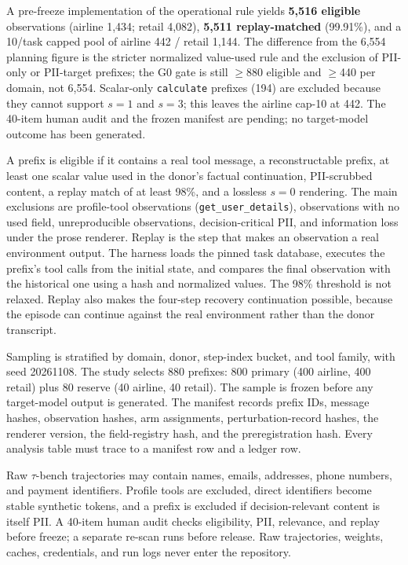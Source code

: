 \documentclass[11pt,a4paper]{article}
\begin{document}
A pre-freeze implementation of the operational rule yields \textbf{5,516 eligible} observations
(airline 1,434; retail 4,082), \textbf{5,511 replay-matched} (99.91\%), and a 10/task capped pool
of airline 442 / retail 1,144. The difference from the 6,554 planning figure is the stricter
normalized value-used rule and the exclusion of PII-only or PII-target prefixes; the G0 gate is
still $\ge$880 eligible and $\ge$440 per domain, not 6,554. Scalar-only \texttt{calculate}
prefixes (194) are excluded because they cannot support $s=1$ and $s=3$; this leaves the airline
cap-10 at 442. The 40-item human audit and the frozen manifest are pending; no target-model
outcome has been generated.

A prefix is eligible if it contains a real tool message, a reconstructable prefix, at least one
scalar value used in the donor's factual continuation, PII-scrubbed content, a replay match of at
least 98\%, and a lossless $s=0$ rendering. The main exclusions are profile-tool observations
(\texttt{get\_user\_details}), observations with no used field, unreproducible observations,
decision-critical PII, and information loss under the prose renderer. Replay is the step that
makes an observation a real environment output. The harness loads the
pinned task database, executes the prefix's tool calls from the initial state, and compares the
final observation with the historical one using a hash and normalized values. The 98\% threshold is
not relaxed. Replay also makes the four-step recovery continuation possible, because the episode
can continue against the real environment rather than the donor transcript.

Sampling is stratified by domain, donor, step-index bucket, and tool family, with seed 20261108.
The study selects 880 prefixes: 800 primary (400 airline, 400 retail) plus 80 reserve (40 airline,
40 retail). The sample is frozen before any target-model output is generated. The manifest records
prefix IDs, message hashes, observation hashes, arm assignments, perturbation-record hashes, the
renderer version, the field-registry hash, and the preregistration hash. Every analysis table must
trace to a manifest row and a ledger row.

Raw $\tau$-bench trajectories may contain names, emails, addresses, phone numbers, and payment
identifiers. Profile tools are excluded, direct identifiers become stable synthetic tokens, and a
prefix is excluded if decision-relevant content is itself PII. A 40-item human audit checks
eligibility, PII, relevance, and replay before freeze; a separate re-scan runs before release. Raw
trajectories, weights, caches, credentials, and run logs never enter the repository.
\end{document}
